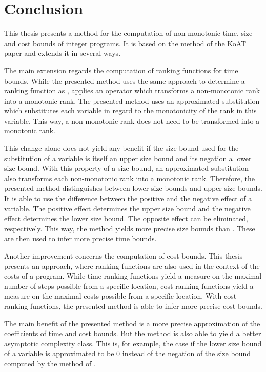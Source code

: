 \section{Conclusion}

This thesis presents a method for the computation of non-monotonic time, size and cost bounds of integer programs.
It is based on the method of the KoAT paper \cite{koat} and extends it in several ways.

The main extension regards the computation of ranking functions for time bounds.
While the presented method uses the same approach to determine a ranking function as \cite{koat}, \cite{koat} applies an operator which transforms a non-monotonic rank into a monotonic rank.
The presented method uses an approximated substitution which substitutes each variable in regard to the monotonicity of the rank in this variable.
This way, a non-monotonic rank does not need to be transformed into a monotonic rank.

This change alone does not yield any benefit if the size bound used for the substitution of a variable is itself an upper size bound and its negation a lower size bound.
With this property of a size bound, an approximated substitution also transforms each non-monotonic rank into a monotonic rank.
Therefore, the presented method distinguishes between lower size bounds and upper size bounds.
It is able to use the difference between the positive and the negative effect of a variable.
The positive effect determines the upper size bound and the negative effect determines the lower size bound.
The opposite effect can be eliminated, respectively.
This way, the method yields more precise size bounds than \cite{koat}.
These are then used to infer more precise time bounds.

Another improvement concerns the computation of cost bounds.
This thesis presents an approach, where ranking functions are also used in the context of the costs of a program.
While time ranking functions yield a measure on the maximal number of steps possible from a specific location, cost ranking functions yield a measure on the maximal costs possible from a specific location.
With cost ranking functions, the presented method is able to infer more precise cost bounds.

The main benefit of the presented method is a more precise approximation of the coefficients of time and cost bounds.
But the method is also able to yield a better asymptotic complexity class.
This is, for example, the case if the lower size bound of a variable is approximated to be $0$ instead of the negation of the size bound computed by the method of \cite{koat}.

